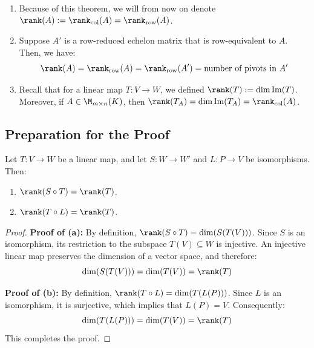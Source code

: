 \begin{remark}
\begin{enumerate}
    \item Because of this theorem, we will from now on denote $\rank(A) := \rank_{\text{col}}(A) = \rank_{\text{row}}(A)$.
    \item Suppose $A'$ is a row-reduced echelon matrix that is row-equivalent to $A$. Then, we have:
    \begin{equation*}
        \rank(A) = \rank_{\text{row}}(A) = \rank_{\text{row}}(A') = \text{number of pivots in } A'
    \end{equation*}
    \item Recall that for a linear map $T: V \to W$, we defined $\rank(T) := \dim \operatorname{Im}(T)$. Moreover, if $A \in \M_{m \times n}(K)$, then $\rank(T_A) = \dim \operatorname{Im}(T_A) = \rank_{\text{col}}(A)$.
\end{enumerate}
\end{remark}

\subsection{Preparation for the Proof}

\begin{lemma}
\label{lemma:rank_invariance_isomorphisms}
Let $T: V \to W$ be a linear map, and let $S: W \to W'$ and $L: P \to V$ be isomorphisms. Then:
\begin{enumerate}
    \item $\rank(S \circ T) = \rank(T)$.
    \item $\rank(T \circ L) = \rank(T)$.
\end{enumerate}
\end{lemma}

\begin{proof}
\textbf{Proof of (a):} By definition, $\rank(S \circ T) = \dim (S(T(V)))$. Since $S$ is an isomorphism, its restriction to the subspace $T(V) \subseteq W$ is injective. An injective linear map preserves the dimension of a vector space, and therefore:
\begin{equation*}
    \dim (S(T(V))) = \dim (T(V)) = \rank(T)
\end{equation*}

\textbf{Proof of (b):} By definition, $\rank(T \circ L) = \dim (T(L(P)))$. Since $L$ is an isomorphism, it is surjective, which implies that $L(P) = V$. Consequently:
\begin{equation*}
    \dim (T(L(P))) = \dim (T(V)) = \rank(T)
\end{equation*}
This completes the proof.
\end{proof}

